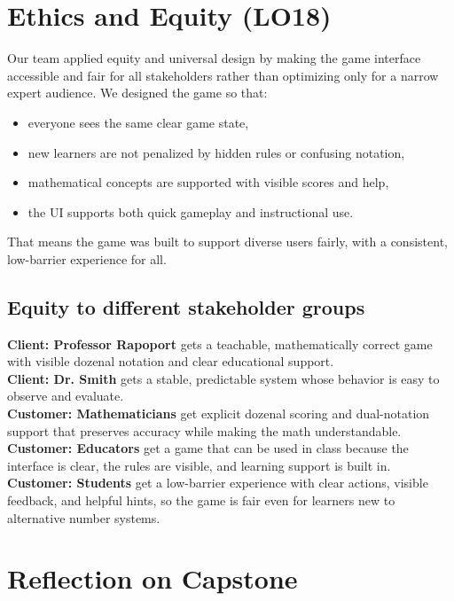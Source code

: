 \documentclass{article}
\begin{document}
\section{Ethics and Equity (LO18)}

Our team applied equity and universal design by making the game interface accessible and fair for all stakeholders rather than optimizing only for a narrow expert audience. We designed the game so that:

\begin{itemize}
    \item everyone sees the same clear game state,
    \item new learners are not penalized by hidden rules or confusing notation,
    \item mathematical concepts are supported with visible scores and help,
    \item the UI supports both quick gameplay and instructional use.
\end{itemize}

That means the game was built to support diverse users fairly, with a consistent, low-barrier experience for all.

\subsection*{Equity to different stakeholder groups}

\textbf{Client: Professor Rapoport} gets a teachable, mathematically correct game with visible dozenal notation and clear educational support.\\
\textbf{Client: Dr. Smith} gets a stable, predictable system whose behavior is easy to observe and evaluate.\\
\textbf{Customer: Mathematicians} get explicit dozenal scoring and dual-notation support that preserves accuracy while making the math understandable.\\
\textbf{Customer: Educators} get a game that can be used in class because the interface is clear, the rules are visible, and learning support is built in.\\
\textbf{Customer: Students} get a low-barrier experience with clear actions, visible feedback, and helpful hints, so the game is fair even for learners new to alternative number systems.


\section{Reflection on Capstone}
\end{document}
